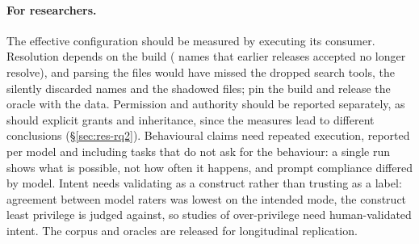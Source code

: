 \paragraph{For researchers.} The effective configuration should be measured by executing its consumer. Resolution
depends on the build (\nRemovedNames{} names that earlier releases accepted no longer resolve), and parsing the files
would have missed the dropped search tools, the silently discarded names and the shadowed files; pin the build and
release the oracle with the data. Permission and authority should be reported separately, as should explicit
grants and inheritance, since the measures lead to different conclusions (\S\ref{sec:res-rq2}). Behavioural claims
need repeated execution, reported per model and including tasks that do not ask for the behaviour: a single run shows
what is possible, not how often it happens, and prompt compliance differed by model. Intent needs validating as a
construct rather than trusting as a label: agreement between model raters was lowest on the intended mode, the construct
least privilege is judged against, so studies of over-privilege need human-validated intent. The corpus and oracles are released for longitudinal replication.
